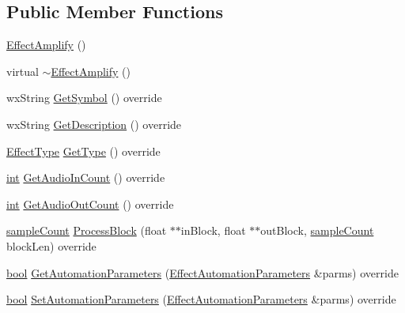 \subsection*{Public Member Functions}
\begin{DoxyCompactItemize}
\item 
\hyperlink{class_effect_amplify_aae26a0c456f679b583479df67e78ac48}{Effect\+Amplify} ()
\item 
virtual \hyperlink{class_effect_amplify_a3628b254576bc59210f94720d2ad81f6}{$\sim$\+Effect\+Amplify} ()
\item 
wx\+String \hyperlink{class_effect_amplify_a7ab4c34e72778f74ce11b8d712c90c82}{Get\+Symbol} () override
\item 
wx\+String \hyperlink{class_effect_amplify_aedc9124e9b4e1fe10a506c91858951cb}{Get\+Description} () override
\item 
\hyperlink{_effect_interface_8h_a4809a7bb3fd1a421902a667cc1405d43}{Effect\+Type} \hyperlink{class_effect_amplify_a5fa129a6df48a2f214167f6e7d2a29bd}{Get\+Type} () override
\item 
\hyperlink{xmltok_8h_a5a0d4a5641ce434f1d23533f2b2e6653}{int} \hyperlink{class_effect_amplify_a5d3befdaef7d377b804eaa1c5db41995}{Get\+Audio\+In\+Count} () override
\item 
\hyperlink{xmltok_8h_a5a0d4a5641ce434f1d23533f2b2e6653}{int} \hyperlink{class_effect_amplify_aaffe816df33e5e3b28648d48d39bc8b6}{Get\+Audio\+Out\+Count} () override
\item 
\hyperlink{include_2audacity_2_types_8h_afa427e1f521ea5ec12d054e8bd4d0f71}{sample\+Count} \hyperlink{class_effect_amplify_a014c3379918d052e4dd4335c83aecd71}{Process\+Block} (float $\ast$$\ast$in\+Block, float $\ast$$\ast$out\+Block, \hyperlink{include_2audacity_2_types_8h_afa427e1f521ea5ec12d054e8bd4d0f71}{sample\+Count} block\+Len) override
\item 
\hyperlink{mac_2config_2i386_2lib-src_2libsoxr_2soxr-config_8h_abb452686968e48b67397da5f97445f5b}{bool} \hyperlink{class_effect_amplify_a560057013408c8efee8490ed0de1e606}{Get\+Automation\+Parameters} (\hyperlink{class_effect_automation_parameters}{Effect\+Automation\+Parameters} \&parms) override
\item 
\hyperlink{mac_2config_2i386_2lib-src_2libsoxr_2soxr-config_8h_abb452686968e48b67397da5f97445f5b}{bool} \hyperlink{class_effect_amplify_a8d59af7672b7324077d08f63f3a4f5f1}{Set\+Automation\+Parameters} (\hyperlink{class_effect_automation_parameters}{Effect\+Automation\+Parameters} \&parms) override
\item 

\end{DoxyCompactItemize}

